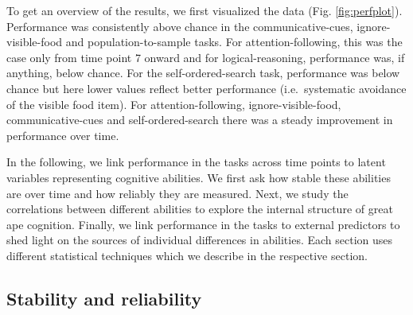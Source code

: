 \documentclass[
  man,floatsintext]{apa6}
\begin{document}
To get an overview of the results, we first visualized the data (Fig. \ref{fig:perfplot}). Performance was consistently above chance in the communicative-cues, ignore-visible-food and population-to-sample tasks. For attention-following, this was the case only from time point 7 onward and for logical-reasoning, performance was, if anything, below chance. For the self-ordered-search task, performance was below chance but here lower values reflect better performance (i.e.~systematic avoidance of the visible food item). For attention-following, ignore-visible-food, communicative-cues and self-ordered-search there was a steady improvement in performance over time.

In the following, we link performance in the tasks across time points to latent variables representing cognitive abilities. We first ask how stable these abilities are over time and how reliably they are measured. Next, we study the correlations between different abilities to explore the internal structure of great ape cognition. Finally, we link performance in the tasks to external predictors to shed light on the sources of individual differences in abilities. Each section uses different statistical techniques which we describe in the respective section.

\hypertarget{stability-and-reliability}{%
\subsection{Stability and reliability}\label{stability-and-reliability}}
\end{document}

